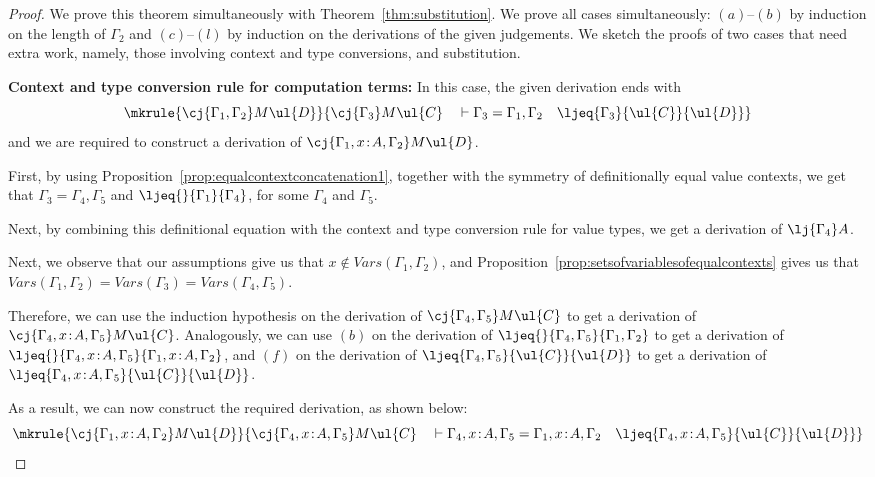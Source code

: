 \begin{proof}
We prove this theorem simultaneously with Theorem~\ref{thm:substitution}.
We prove all cases simultaneously: $(a)$--$(b)$ by induction on the length of $\Gamma_2$ 
and $(c)$--$(l)$ by induction on the derivations of the given judgements. 
We sketch the proofs of two cases that need extra work, namely, those involving context and type conversions, and substitution. 

\vspace{0.2cm}

\noindent \textbf{Context and type conversion rule for computation terms:}
In this case, the given derivation ends with
\[
\mkrule
{\cj {\Gamma_1,\Gamma_2} M {\ul{D}}}
{\cj {\Gamma_3} M {\ul{C}} \quad \vdash \Gamma_3 = \Gamma_1,\Gamma_2 \quad \ljeq {\Gamma_3} {\ul{C}} {\ul{D}}}
\]
and we are required to construct a derivation of ${\cj {\Gamma_1, x \!:\! A,\Gamma_2} M {\ul{D}}}$.

First, by using Proposition~\ref{prop:equalcontextconcatenation1}, together with the symmetry of definitionally equal value contexts, we get that $\Gamma_3 = \Gamma_4,\Gamma_5$ and $\ljeq {} {\Gamma_1} {\Gamma_4}$, for some $\Gamma_4$ and $\Gamma_5$. 

Next, by combining this definitional equation with the context and type conversion rule for value types, we get a derivation of $\lj {\Gamma_4} A$.

Next, we observe that our assumptions give us that $x \not\in V\!ars(\Gamma_1,\Gamma_2)$, and Proposition~\ref{prop:setsofvariablesofequalcontexts} gives us that $V\!ars(\Gamma_1,\Gamma_2) = V\!ars(\Gamma_3) = V\!ars(\Gamma_4,\Gamma_5)$. 

Therefore, we can use the induction hypothesis on the derivation of $\cj {\Gamma_4,\Gamma_5} M {\ul{C}}$ to get a derivation of $\cj {\Gamma_4,x \!:\! A,\Gamma_5} M {\ul{C}}$. Analogously, we can use $(b)$ on the derivation of $\ljeq {} {\Gamma_4,\Gamma_5} {\Gamma_1,\Gamma_2}$ to get a derivation of $\ljeq {} {\Gamma_4,x \!:\! A,\Gamma_5} {\Gamma_1,x \!:\! A,\Gamma_2}$, and $(f)$ on the derivation of $\ljeq {\Gamma_4,\Gamma_5} {\ul{C}} {\ul{D}}$ to get a derivation of $\ljeq {\Gamma_4,x \!:\! A,\Gamma_5} {\ul{C}} {\ul{D}}$.

As a result, we can now construct the required derivation, as shown below:
\[
\mkrule
{\cj {\Gamma_1, x \!:\! A,\Gamma_2} M {\ul{D}}}
{\cj {\Gamma_4,x \!:\! A,\Gamma_5} M {\ul{C}} \quad \vdash \Gamma_4,x \!:\! A,\Gamma_5 = \Gamma_1, x \!:\! A,\Gamma_2 \quad \ljeq {\Gamma_4,x \!:\! A,\Gamma_5} {\ul{C}} {\ul{D}}}
\]


\end{proof}
